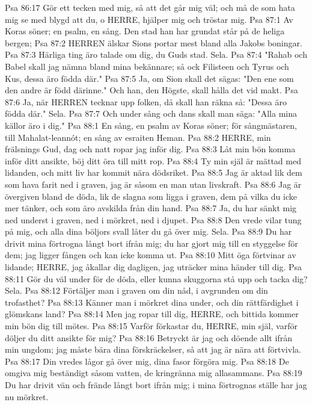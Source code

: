 Psa 86:17  Gör ett tecken med mig, så att det går mig väl; och må de som hata mig se med blygd att du, o HERRE, hjälper mig och tröstar mig.
Psa 87:1  Av Koras söner; en psalm, en sång. Den stad han har grundat står på de heliga bergen;
Psa 87:2  HERREN älskar Sions portar mest bland alla Jakobs boningar.
Psa 87:3  Härliga ting äro talade om dig, du Guds stad. Sela.
Psa 87:4  "Rahab och Babel skall jag nämna bland mina bekännare; så ock Filisteen och Tyrus och Kus, dessa äro födda där."
Psa 87:5  Ja, om Sion skall det sägas: "Den ene som den andre är född därinne." Och han, den Högste, skall hålla det vid makt.
Psa 87:6  Ja, när HERREN tecknar upp folken, då skall han räkna så: "Dessa äro födda där." Sela.
Psa 87:7  Och under sång och dans skall man säga: "Alla mina källor äro i dig."
Psa 88:1  En sång, en psalm av Koras söner; för sångmästaren, till Mahalat-leannót; en sång av esraiten Heman.
Psa 88:2  HERRE, min frälsnings Gud, dag och natt ropar jag inför dig.
Psa 88:3  Låt min bön komma inför ditt ansikte, böj ditt öra till mitt rop.
Psa 88:4  Ty min själ är mättad med lidanden, och mitt liv har kommit nära dödsriket.
Psa 88:5  Jag är aktad lik dem som hava farit ned i graven, jag är såsom en man utan livskraft.
Psa 88:6  Jag är övergiven bland de döda, lik de slagna som ligga i graven, dem på vilka du icke mer tänker, och som äro avskilda från din hand.
Psa 88:7  Ja, du har sänkt mig ned underst i graven, ned i mörkret, ned i djupet.
Psa 88:8  Den vrede vilar tung på mig, och alla dina böljors svall låter du gå över mig. Sela.
Psa 88:9  Du har drivit mina förtrogna långt bort ifrån mig; du har gjort mig till en styggelse för dem; jag ligger fången och kan icke komma ut.
Psa 88:10  Mitt öga förtvinar av lidande; HERRE, jag åkallar dig dagligen, jag uträcker mina händer till dig.
Psa 88:11  Gör du väl under för de döda, eller kunna skuggorna stå upp och tacka dig? Sela.
Psa 88:12  Förtäljer man i graven om din nåd, i avgrunden om din trofasthet?
Psa 88:13  Känner man i mörkret dina under, och din rättfärdighet i glömskans land?
Psa 88:14  Men jag ropar till dig, HERRE, och bittida kommer min bön dig till mötes.
Psa 88:15  Varför förkastar du, HERRE, min själ, varför döljer du ditt ansikte för mig?
Psa 88:16  Betryckt är jag och döende allt ifrån min ungdom; jag måste bära dina förskräckelser, så att jag är nära att förtvivla.
Psa 88:17  Din vredes lågor gå över mig, dina fasor förgöra mig.
Psa 88:18  De omgiva mig beständigt såsom vatten, de kringränna mig allasammans.
Psa 88:19  Du har drivit vän och frände långt bort ifrån mig; i mina förtrognas ställe har jag nu mörkret.
